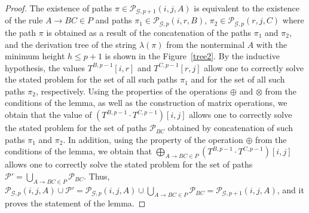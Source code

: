 \begin{proof}
	The existence of paths $\pi \in \mathcal{P}_{\mathcal{G}, p + 1}(i, j, A)$ is equivalent to the existence of the rule $A \to B C \in P$ and paths $\pi_1 \in \mathcal{P}_{\mathcal{G}, p}(i, r, B)$, $\pi_2 \in \mathcal{P}_{\mathcal{G}, p}(r, j, C)$ where the path $\pi$ is obtained as a result of the concatenation of the paths $\pi_1$ and $\pi_2$, and the derivation tree of the string $\lambda(\pi)$ from the nonterminal $A$ with the minimum height $h \leq p + 1$ is shown in the Figure~\ref{tree2}. By the inductive hypothesis, the values $T^{B, p - 1}[i, r]$ and $T^{C, p - 1}[r, j]$ allow one to correctly solve the stated problem for the set of all such paths $\pi_1$ and for the set of all such paths $\pi_2$, respectively. Using the properties of the operations $\oplus$ and $\otimes$ from the conditions of the lemma, as well as the construction of matrix operations, we obtain that the value of $(T^{B, p - 1} \cdot T^{C, p - 1})[i, j]$ allows one to correctly solve the stated problem for the set of paths $\mathcal{P}_{\textit{BC}}$ obtained by concatenation of such paths $\pi_1$ and $\pi_2$. In addition, using the property of the operation $\oplus$ from the conditions of the lemma, we obtain that $\bigoplus_{A \to B C \in P} (T^{B, p - 1} \cdot T^{C, p - 1}) [i, j]$ allows one to correctly solve the stated problem for the set of paths $\mathcal{P}' = \bigcup_{A \to B C \in P} \mathcal{P}_{\textit{BC}}$. Thus, $\mathcal{P}_{\mathcal{G}, p}(i, j, A) \cup \mathcal{P}' = \mathcal{P}_{\mathcal{G}, p}(i, j, A) \cup \bigcup_{A \to B C \in P} \mathcal{P}_{\textit{BC}} = \mathcal{P}_{\mathcal{G}, p + 1}(i, j, A)$, and it proves the statement of the lemma.
	

\end{proof}
